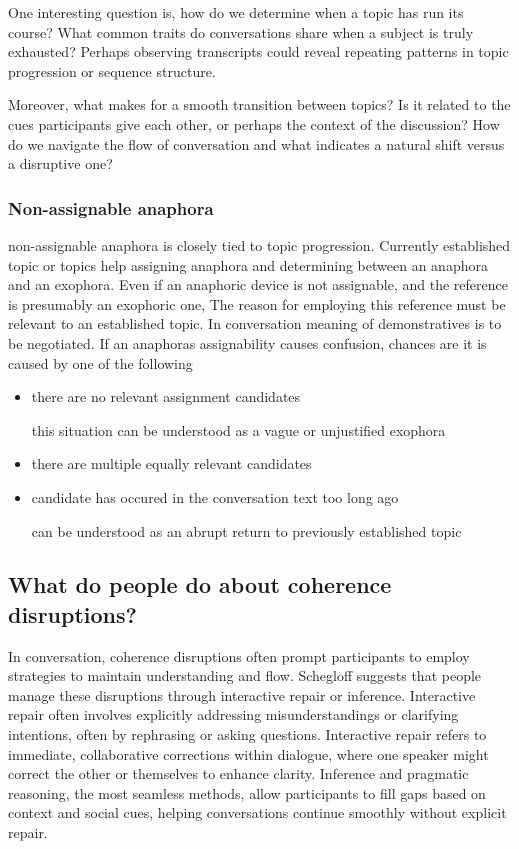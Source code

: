 \documentclass[12pt]{report}
\begin{document}
{\par
    One interesting question is,
    how do we determine when a topic has run its course?
    What common traits do conversations share when a subject is truly exhausted?
    Perhaps observing transcripts could reveal repeating patterns in topic progression or sequence structure.

\par
    Moreover, what makes for a smooth transition between topics?
    Is it related to the cues participants give each other,
    or perhaps the context of the discussion?
    How do we navigate the flow of conversation and
    what indicates a natural shift versus a disruptive one?

\subsubsection{Non-assignable anaphora}
\par
    non-assignable anaphora is closely tied to topic progression.
    Currently established topic or topics help assigning anaphora and
    determining between an anaphora and an exophora.
    Even if an anaphoric device is not assignable,
    and the reference is presumably an exophoric one,
    The reason for employing this reference must be
    relevant to an established topic.
    In conversation meaning of demonstratives is to be negotiated.
    If an anaphoras assignability causes confusion,
    chances are it is caused by one of the following

\begin{itemize}
\item
there are no relevant assignment candidates

    \quad
    this situation can be understood as a vague or unjustified exophora

\item
there are multiple equally relevant candidates

\item
candidate has occured in the conversation text too long ago

    \quad
    can be understood as an abrupt return to previously established topic
\end{itemize}

\subsection{What do people do about coherence disruptions?}
\par
In conversation, coherence disruptions often prompt participants to
employ strategies to maintain understanding and flow.
Schegloff suggests that people manage these disruptions through interactive repair or inference.
Interactive repair often involves
explicitly addressing misunderstandings or clarifying intentions,
often by rephrasing or asking questions.
Interactive repair refers to immediate, collaborative corrections within dialogue,
where one speaker might correct the other or themselves to enhance clarity.
Inference and pragmatic reasoning, the most seamless methods,
allow participants to fill gaps based on context and social cues,
helping conversations continue smoothly without explicit repair.

}
\end{document}
